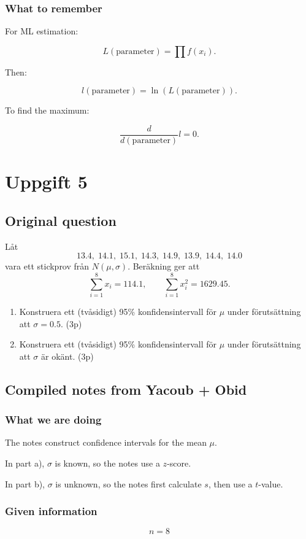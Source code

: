 \documentclass[10pt]{article}
\begin{document}
\subsubsection*{What to remember}
For ML estimation:

\[
L(\text{parameter})
=
\prod f(x_i).
\]

Then:

\[
l(\text{parameter})
=\ln(L(\text{parameter})).
\]

To find the maximum:

\[
\frac{d}{d(\text{parameter})}l=0.
\]

\section*{Uppgift 5}

\subsection*{Original question}
Låt
\[
13.4,\;14.1,\;15.1,\;14.3,\;14.9,\;13.9,\;14.4,\;14.0
\]
vara ett stickprov från \(N(\mu,\sigma)\).
Beräkning ger att
\[
\sum_{i=1}^{8}x_i=114.1,
\qquad
\sum_{i=1}^{8}x_i^2=1629.45.
\]

\begin{enumerate}[label=\alph*)]
\item Konstruera ett (tvåsidigt) 95\%
konfidensintervall för \(\mu\) under
förutsättning att \(\sigma=0.5\).
\hfill (3p)

\item Konstruera ett (tvåsidigt) 95\%
konfidensintervall för \(\mu\) under
förutsättning att \(\sigma\) är okänt.
\hfill (3p)
\end{enumerate}

\subsection*{Compiled notes from Yacoub + Obid}

\subsubsection*{What we are doing}
The notes construct confidence intervals for the
mean \(\mu\).

In part a), \(\sigma\) is known, so the notes use
a \(z\)-score.

In part b), \(\sigma\) is unknown, so the notes first
calculate \(s\), then use a \(t\)-value.

\subsubsection*{Given information}
\[
n=8
\]
\end{document}

